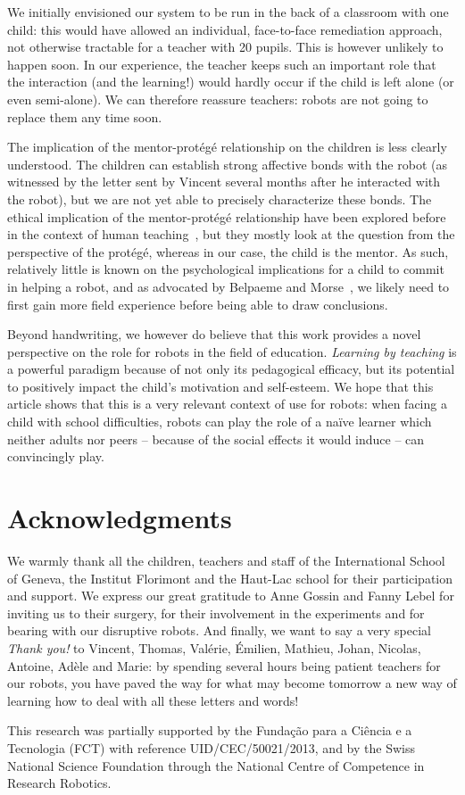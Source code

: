\documentclass{article}
\begin{document}
We initially envisioned our system to be run in the back of a classroom with one
child: this would have allowed an individual, face-to-face remediation approach,
not otherwise tractable for a teacher with 20 pupils.  This is however unlikely
to happen soon. In our experience, the teacher keeps such an important role that
the interaction (and the learning!) would hardly occur if the child is left
alone (or even semi-alone). We can therefore reassure teachers: robots are not
going to replace them any time soon.

The implication of the mentor-protégé relationship on the children is less
clearly understood. The children can establish strong affective bonds with the robot (as
witnessed by the letter sent by Vincent several months after he interacted with
the robot), but we are not yet able to precisely characterize these bonds. The
ethical implication of the mentor-protégé relationship have been explored before
in the context of human teaching~\cite{brad1999mentor,wendelyn2008context}, but
they mostly look at the question from the perspective of the protégé, whereas in our
case, the child is the mentor. As such, relatively little is known on the
psychological implications for a child to commit in helping a robot, and as
advocated by Belpaeme and Morse~\cite{belpaeme2010time}, we likely need to first
gain more field experience before being able to draw conclusions.

Beyond handwriting, we however do believe that this work provides a novel
perspective on the role for robots in the field of education. \emph{Learning by
teaching} is a powerful paradigm because of not only its pedagogical efficacy,
but its potential to positively impact the child's motivation and self-esteem.
We hope that this article shows that this is a very relevant context of use for
robots: when facing a child with school difficulties, robots can play the role
of a naïve learner which neither adults nor peers -- because of the social
effects it would induce -- can convincingly play.


\section*{Acknowledgments}

We warmly thank all the children, teachers and staff of the International School
of Geneva, the Institut Florimont and the Haut-Lac school for their
participation and support. We express our great gratitude to Anne Gossin and
Fanny Lebel for inviting us to their surgery, for their involvement in the
experiments and for bearing with our disruptive robots. And finally, we want to
say a very special \emph{Thank you!} to Vincent, Thomas, Valérie, Émilien,
Mathieu, Johan, Nicolas, Antoine, Adèle and Marie: by spending several hours
being patient teachers for our robots, you have paved the way for what may
become tomorrow a new way of learning how to deal with all these letters and
words!

This research was partially supported by the Funda\c{c}\~{a}o para a Ci\^{e}ncia
e a Tecnologia (FCT) with reference UID/CEC/50021/2013, and by the Swiss
National Science Foundation through the National Centre of Competence in
Research Robotics.



\end{document}
